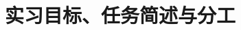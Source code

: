 \documentclass[UTF8]{article}
\begin{document}




\begin{titlepage}

\end{titlepage}

\tableofcontents
\cleardoublepage

%
\section{实习目标、任务简述与分工}
\end{document}

